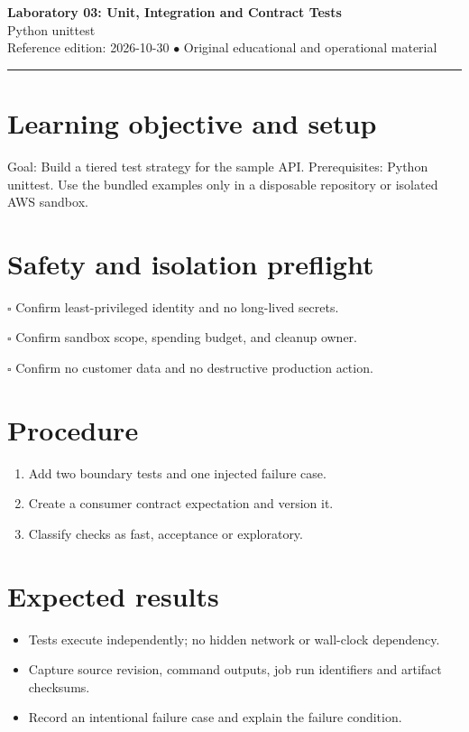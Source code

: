 \documentclass[10pt,letterpaper]{article}
\begin{document}
\begin{center}
{\LARGE\bfseries\color{cdblue}Laboratory 03: Unit, Integration and Contract Tests}\\[7pt]
{\large Python unittest}\\[6pt]
{\small Reference edition: 2026-10-30 $\bullet$ Original educational and operational material}
\end{center}
\noindent\color{cdblue}\rule{\linewidth}{1.2pt}\color{black}
\vspace{0.4em}
\section{Learning objective and setup}
Goal: Build a tiered test strategy for the sample API. Prerequisites: Python unittest. Use the bundled examples only in a disposable repository or isolated AWS sandbox.


\section{Safety and isolation preflight}
\noindent $\square$ Confirm least-privileged identity and no long-lived secrets.\par\vspace{0.35em}
\noindent $\square$ Confirm sandbox scope, spending budget, and cleanup owner.\par\vspace{0.35em}
\noindent $\square$ Confirm no customer data and no destructive production action.\par\vspace{0.35em}

\section{Procedure}
\begin{enumerate}
\item Add two boundary tests and one injected failure case.
\item Create a consumer contract expectation and version it.
\item Classify checks as fast, acceptance or exploratory.
\end{enumerate}

\section{Expected results}
\begin{itemize}
\item Tests execute independently; no hidden network or wall-clock dependency.
\item Capture source revision, command outputs, job run identifiers and artifact checksums.
\item Record an intentional failure case and explain the failure condition.
\end{itemize}
\end{document}
